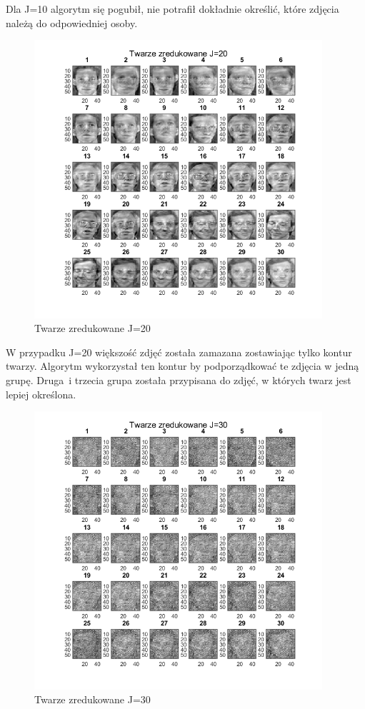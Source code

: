 \documentclass[11pt, a4paper]{article}
\newcommand{\fbi}{\leavevmode{\parindent=1em\indent}}
\begin{document}
\fbi
Dla J=10 algorytm się pogubił, nie potrafił dokładnie określić, które zdjęcia należą do odpowiedniej osoby.


\begin{figure}[H]
	\centering
	\includegraphics[width=0.95\textwidth]{./assets/ilustracja_zad2_redukcja_j20.png}
	\caption{Twarze zredukowane J=20}
	\label{fig:ilustracja_zad2_redukcja_j20}
\end{figure}

\fbi
W przypadku J=20 większość zdjęć została zamazana zostawiając tylko kontur twarzy. Algorytm wykorzystał ten kontur by podporządkować te zdjęcia w jedną grupę.
Druga~i trzecia grupa została przypisana do zdjęć, w których twarz jest lepiej określona.


\begin{figure}[H]
	\centering
	\includegraphics[width=0.95\textwidth]{./assets/ilustracja_zad2_redukcja_j30.png}
	\caption{Twarze zredukowane J=30}
	\label{fig:ilustracja_zad2_redukcja_j30}
\end{figure}
\end{document}

